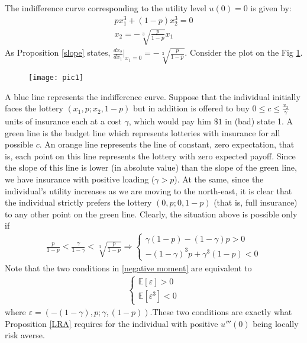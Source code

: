 \documentclass[a4paper]{article}
\newcommand{\expect}{\mathbb{E}}
\newcommand{\eps}{\varepsilon}
\begin{document}
The indifference curve corresponding to the utility level $u(0) = 0$ is given by:
\begin{align*}
	px_1^3 + (1-p)x_2^3 = 0\\
	x_2 = -\sqrt[3]{\frac{p}{1-p}} x_1
\end{align*}
As Proposition \ref{slope} states, $\frac{dx_2}{dx_1}\bigg|_{x_1=0} = -\sqrt[3]{\frac{p}{1-p}}$.
Consider the plot on the Fig \ref{fig1}. 
\begin{figure}[H]
	\centering
	\texttt{[image: pic1]}
	\caption{}\label{fig1}
\end{figure}

A blue line represents the indifference curve. Suppose that the individual initially faces the lottery $(x_1, p; x_2, 1-p)$ but in addition is offered to buy $0 \le c \le \frac{x_2}{\gamma}$ units of insurance each at a cost $\gamma$, which would pay him $\$ 1$ in (bad) state 1. A green line is the budget line which represents lotteries with insurance for all possible $c$. An orange line represents the line of constant, zero expectation, that is, each point on this line represents the lottery with zero expected payoff. Since the slope of this line is lower (in absolute value) than the slope of the green line, we have insurance with positive loading ($\gamma > p$). At the same, since the individual's utility increases as we are moving to the north-east, it is clear that the individual strictly prefers the lottery $(0, p; 0, 1-p)$ (that is, full insurance) to any other point on the green line. Clearly, the situation above is possible only if 
\begin{align}\label{negative moment}
	\frac{p}{1-p} < \frac{\gamma}{1-\gamma}< \sqrt[3]{\frac{p}{1-p}} \Rightarrow \begin{cases}
		\gamma(1-p) - (1-\gamma)p > 0\\
		-(1-\gamma)^3p+\gamma^3(1-p)<0
		\end{cases}
\end{align}
Note that the two conditions in \eqref{negative moment} are equivalent to 
\begin{align*}
	\begin{cases}
			\expect[\eps] >0\\
	\expect[\eps^3] < 0
	\end{cases}
\end{align*}
where $\eps = (-(1-\gamma), p; \gamma, (1-p))$.These two conditions are exactly what Proposition \ref{LRA} requires for the individual with positive $u'''(0)$ being locally risk averse.
\end{document}
